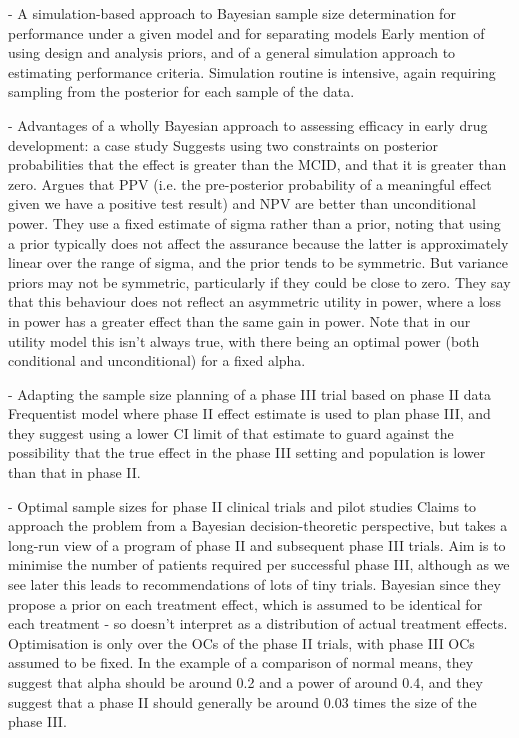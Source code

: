 \documentclass{article} %
\begin{document}
\cite{Wang2002} - A simulation-based approach to Bayesian sample size determination for performance under a given model and for separating models
Early mention of using design and analysis priors, and of a general simulation approach to estimating performance criteria. Simulation routine is intensive, again requiring sampling from the posterior for each sample of the data.

\cite{Walley2015} - Advantages of a wholly Bayesian approach to assessing efficacy in early drug development: a case study
Suggests using two constraints on posterior probabilities that the effect is greater than the MCID, and that it is greater than zero. Argues that PPV (i.e. the pre-posterior probability of a meaningful effect given we have a positive test result) and NPV are better than unconditional power. They use a fixed estimate of sigma rather than a prior, noting that using a prior typically does not affect the assurance because the latter is approximately linear over the range of sigma, and the prior tends to be symmetric. But variance priors may not be symmetric, particularly if they could be close to zero. They say that this behaviour does not reflect an asymmetric utility in power, where a loss in power has a greater effect than the same gain in power. Note that in our utility model this isn't always true, with there being an optimal power (both conditional and unconditional) for a fixed alpha.

\cite{Wang2006} - Adapting the sample size planning of a phase III trial based on phase II data
Frequentist model where phase II effect estimate is used to plan phase III, and they suggest using a lower CI limit of that estimate to guard against the possibility that the true effect in the phase III setting and population is lower than that in phase II.

\cite{Stallard2012} - Optimal sample sizes for phase II clinical trials and pilot studies
Claims to approach the problem from a Bayesian decision-theoretic perspective, but takes a long-run view of a program of phase II and subsequent phase III trials. Aim is to minimise the number of patients required per successful phase III, although as we see later this leads to recommendations of lots of tiny trials. Bayesian since they propose a prior on each treatment effect, which is assumed to be identical for each treatment - so doesn't interpret as a distribution of actual treatment effects. Optimisation is only over the OCs of the phase II trials, with phase III OCs assumed to be fixed. In the example of a comparison of normal means, they suggest that alpha should be around 0.2 and a power of around 0.4, and they suggest that a phase II should generally be around 0.03 times the size of the phase III.
\end{document}

